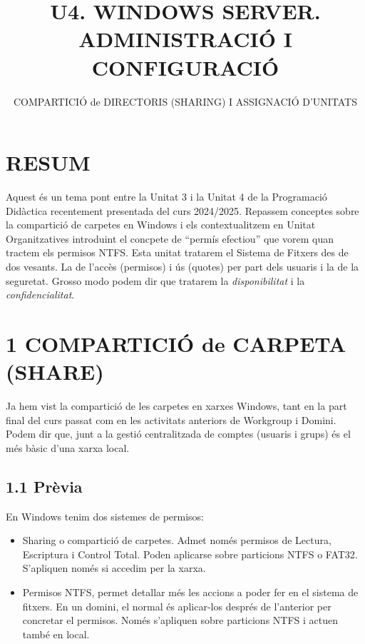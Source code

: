 \documentclass[
  a4paper,
]{article}
\title{U4. WINDOWS SERVER. ADMINISTRACIÓ I CONFIGURACIÓ}
\subtitle{COMPARTICIÓ de DIRECTORIS (SHARING) I ASSIGNACIÓ D'UNITATS}
\author{}
\date{\vspace{-2.5em}}
\begin{document}
\maketitle

{
\setcounter{tocdepth}{2}
\tableofcontents
}
\renewcommand\tablename{Tabla}
\newpage

\section{RESUM}\label{resum}

Aquest és un tema pont entre la Unitat 3 i la Unitat 4 de la Programació
Didàctica recentement presentada del curs 2024/2025. Repassem conceptes
sobre la compartició de carpetes en Windows i els contextualitzem en
Unitat Organitzatives introduint el concpete de ``permís efectiou'' que
vorem quan tractem els permisos NTFS. Esta unitat tratarem el Sistema de
Fitxers des de dos vesants. La de l'accès (permisos) i ús (quotes) per
part dels usuaris i la de la seguretat. Grosso modo podem dir que
tratarem la \emph{disponibilitat} i la \emph{confidencialitat}.

\section{1 COMPARTICIÓ de CARPETA
(SHARE)}\label{comparticiuxf3-de-carpeta-share}

Ja hem vist la compartició de les carpetes en xarxes Windows, tant en la
part final del curs passat com en les activitats anteriors de Workgroup
i Domini. Podem dir que, junt a la gestió centralitzada de comptes
(usuaris i grups) és el més bàsic d'una xarxa local.

\subsection{1.1 Prèvia}\label{pruxe8via}

En Windows tenim dos sistemes de permisos:

\begin{itemize}
\item
  Sharing o compartició de carpetes. Admet només permisos de Lectura,
  Escriptura i Control Total. Poden aplicarse sobre particions NTFS o
  FAT32. S'apliquen només si accedim per la xarxa.
\item
  Permisos NTFS, permet detallar més les accions a poder fer en el
  sistema de fitxers. En un domini, el normal és aplicar-los després de
  l'anterior per concretar el permisos. Només s'apliquen sobre
  particions NTFS i actuen també en local.
\end{itemize}
\end{document}
